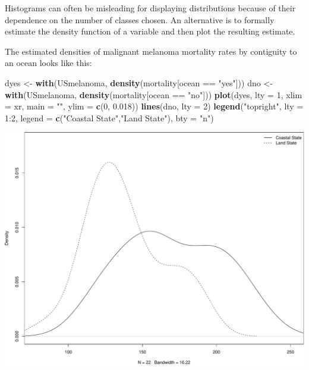 \documentclass[]{article}
\newenvironment{Shaded}{\begin{snugshade}}{\end{snugshade}}
\newcommand{\KeywordTok}[1]{\textcolor[rgb]{0.13,0.29,0.53}{\textbf{{#1}}}}
\newcommand{\DataTypeTok}[1]{\textcolor[rgb]{0.13,0.29,0.53}{{#1}}}
\newcommand{\DecValTok}[1]{\textcolor[rgb]{0.00,0.00,0.81}{{#1}}}
\newcommand{\FloatTok}[1]{\textcolor[rgb]{0.00,0.00,0.81}{{#1}}}
\newcommand{\StringTok}[1]{\textcolor[rgb]{0.31,0.60,0.02}{{#1}}}
\newcommand{\NormalTok}[1]{{#1}}
\numberwithin{equation}{section}
\begin{document}
Histograms can often be misleading for displaying distributions because
of their dependence on the number of classes chosen. An alternative is
to formally estimate the density function of a variable and then plot
the resulting estimate.

The estimated densities of malignant melanoma mortality rates by
contiguity to an ocean looks like this:

\begin{Shaded}
\begin{Highlighting}[]
\NormalTok{dyes <-}\StringTok{ }\KeywordTok{with}\NormalTok{(USmelanoma, }\KeywordTok{density}\NormalTok{(mortality[ocean ==}\StringTok{ "yes"}\NormalTok{]))}
\NormalTok{dno <-}\StringTok{ }\KeywordTok{with}\NormalTok{(USmelanoma, }\KeywordTok{density}\NormalTok{(mortality[ocean ==}\StringTok{ "no"}\NormalTok{]))}
\KeywordTok{plot}\NormalTok{(dyes, }\DataTypeTok{lty =} \DecValTok{1}\NormalTok{, }\DataTypeTok{xlim =} \NormalTok{xr, }\DataTypeTok{main =} \StringTok{""}\NormalTok{, }\DataTypeTok{ylim =} \KeywordTok{c}\NormalTok{(}\DecValTok{0}\NormalTok{, }\FloatTok{0.018}\NormalTok{))}
\KeywordTok{lines}\NormalTok{(dno, }\DataTypeTok{lty =} \DecValTok{2}\NormalTok{)}
\KeywordTok{legend}\NormalTok{(}\StringTok{"topright"}\NormalTok{, }\DataTypeTok{lty =} \DecValTok{1}\NormalTok{:}\DecValTok{2}\NormalTok{, }\DataTypeTok{legend =} \KeywordTok{c}\NormalTok{(}\StringTok{"Coastal State"}\NormalTok{,}\StringTok{"Land State"}\NormalTok{), }\DataTypeTok{bty =} \StringTok{"n"}\NormalTok{)}
\end{Highlighting}
\end{Shaded}

\begin{center}\includegraphics{index_files/figure-latex/unnamed-chunk-262-1} \end{center}
\end{document}
